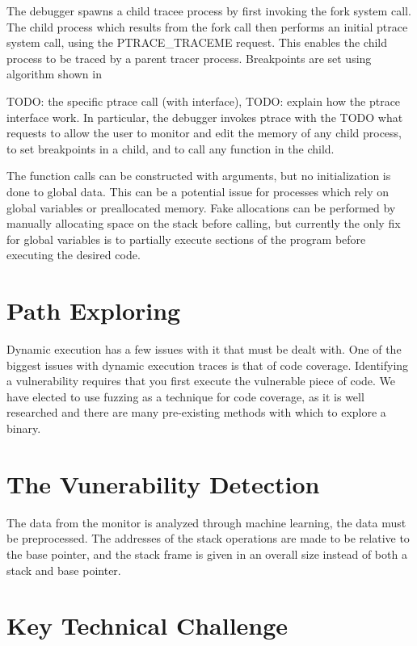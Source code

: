 \documentclass{article}
\begin{document}
The debugger spawns a child tracee process by first invoking the fork system call. The child process which results from
the fork call then performs an initial ptrace system call, using the PTRACE\_TRACEME request. This enables the child
process to be traced by a parent tracer process. Breakpoints are set using algorithm shown in %

TODO: the specific ptrace call (with interface), TODO: explain how the ptrace interface work. In particular, the
debugger invokes ptrace with the TODO {what requests} to allow the user to monitor and edit the memory of any child
process, to set breakpoints in a child, and to call any function in the child.

The function calls can be constructed with arguments, but no initialization is done to global data. This can be a
potential issue for processes which rely on global variables or preallocated memory. Fake allocations can be performed
by manually allocating space on the stack before calling, but currently the only fix for global variables is to
partially execute sections of the program before executing the desired code.


\section {Path Exploring} Dynamic execution has a few issues with it that must be dealt with. One of the biggest issues
with dynamic execution traces is that of code coverage. Identifying a vulnerability requires that you first execute the
vulnerable piece of code. We have elected to use fuzzing as a technique for code coverage, as it is well researched and
there are many pre-existing methods with which to explore a binary.

\section {The Vunerability Detection} The data from the monitor is analyzed through machine learning, the data must be
preprocessed. The addresses of the stack operations are made to be relative to the base pointer, and the stack frame is
given in an overall size instead of both a stack and base pointer.

\section{Key Technical Challenge}
\end{document}
